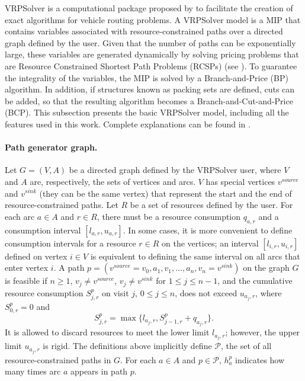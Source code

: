 \documentclass[3p, authoryear, 11pt]{elsarticle}
\begin{document}
VRPSolver is a computational package proposed by \citet{pessoa_generic_2019} to facilitate the creation of exact algorithms for vehicle routing problems. A VRPSolver model is a MIP that contains variables associated with resource-constrained paths over a directed graph defined by the user. Given that the number of paths can be exponentially large, these variables are generated dynamically by solving pricing problems that are Resource Constrained Shortest Path Problems (RCSPs) (see \citet{irnich_shortest_2005}). To guarantee the integrality of the variables, the MIP is solved by a Branch-and-Price (BP) algorithm. In addition, if structures known as packing sets are defined, cuts can be added, so that the resulting algorithm becomes a Branch-and-Cut-and-Price (BCP). This subsection presents the basic VRPSolver model, including all the features used in this work. Complete explanations can be found in \citet{pessoa_generic_2020}.

\paragraph{Path generator graph.} Let $G=(V,A)$ be a directed graph defined by the VRPSolver user, where $V$ and $A$ are, respectively, the sets of vertices and arcs. $V$ has special vertices $v^{source}$ and $v^{sink}$ (they can be the same vertex) that represent the start and the end of resource-constrained paths. Let $R$ be a set of resources defined by the user. For each arc $a\in A$ and $r\in R$, there must be a resource consumption $q_{a,r}$ and a consumption interval $[l_{a,r},u_{a,r}]$. In some cases, it is more convenient to define consumption intervals for a resource $r\in R$ on the vertices; an interval $[l_{i,r},u_{i,r}]$ defined on vertex $i\in V$ is equivalent to defining the same interval on all arcs that enter vertex $i$. A path $p=(v^{source}=v_0,a_1,v_1,\ldots,a_n,v_n=v^{sink})$ on the graph $G$ is feasible if $n\ge 1$, $v_j\neq v^{source}$, $v_j\neq v^{sink}$ for $1\le j\le n-1$, and the cumulative resource consumption $S^p_{j,r}$ on visit $j$, $0\le j\le n$, does not exceed $u_{a_j,r}$, where $S^p_{0,r}=0$ and
\begin{equation}
S^p_{j,r}=\max\{l_{a_j,r},S^p_{j-1,r}+q_{a_j,r}\}.
\end{equation}
It is allowed to discard resources to meet the lower limit $l_{a_j,r}$; however, the upper limit $u_{a_j,r}$ is rigid. The definitions above implicitly define $\mathcal{P}$, the set of all resource-constrained paths in $G$. For each $a\in A$ and $p\in \mathcal{P}$, $h_a^p$ indicates how many times arc $a$ appears in path $p$.
\end{document}
